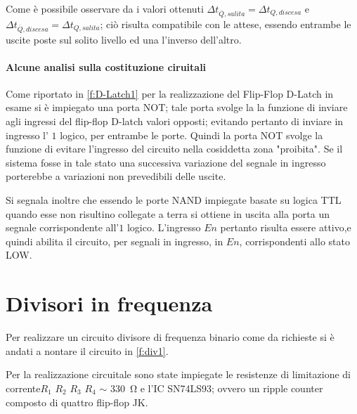 	Come è possibile osservare da i valori ottenuti $\Delta t_{\overline{Q},salita} = \Delta t_{{Q},discesa}$ e $\Delta t_{\overline{Q},discesa} = \Delta t_{{Q},salita}$; ciò risulta compatibile con le attese, essendo entrambe le uscite poste sul solito livello ed una l'inverso dell'altro.
	\paragraph{Alcune analisi sulla costituzione ciruitali }
	Come riportato in \figurename{ \ref{f:D-Latch1}} per la realizzazione del Flip-Flop D-Latch in esame si è impiegato una porta NOT;
	tale porta svolge la la funzione di inviare agli ingressi del flip-flop D-latch valori opposti; evitando pertanto di inviare in ingresso l' $1$ logico, per entrambe le porte.
	Quindi la porta NOT svolge la funzione di evitare l'ingresso del circuito nella cosiddetta zona "proibita".
	Se il sistema fosse in tale stato una successiva variazione del segnale in ingresso porterebbe a variazioni non prevedibili delle uscite.

	Si segnala inoltre che essendo le porte NAND impiegate basate su logica TTL quando esse non risultino collegate a terra si ottiene in uscita alla porta un segnale corrispondente all'$1$ logico.
	L'ingresso $En$ pertanto risulta essere attivo,e quindi abilita il circuito, per
	segnali in ingresso, in $En$, corrispondenti allo stato LOW.

	\section{Divisori in frequenza}
	Per realizzare un circuito divisore di frequenza binario come da richieste si è andati a nontare il circuito in \figurename{ \ref{f:div1}}.

	Per la realizzazione circuitale sono state impiegate le resistenze di limitazione di corrente$R_{1}$ $R_{2}$ $R_{3}$	$R_{4}$ $\sim$ \SI{330}{\ohm}
	e l'IC SN74LS93; ovvero un ripple counter composto di quattro flip-flop JK.

